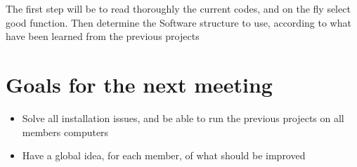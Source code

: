 \documentclass[aps,letterpaper,11pt]{revtex4}
\begin{document}
The first step will be to read thoroughly the current codes, and on the fly select good function. Then determine the Software structure to use, according to what have been learned from the previous projects


\section{Goals for the next meeting}

\begin{itemize}
\item Solve all installation issues, and be able to run the previous projects on all members computers
\item Have a global idea, for each member, of what should be improved
\end{itemize}
\end{document}
